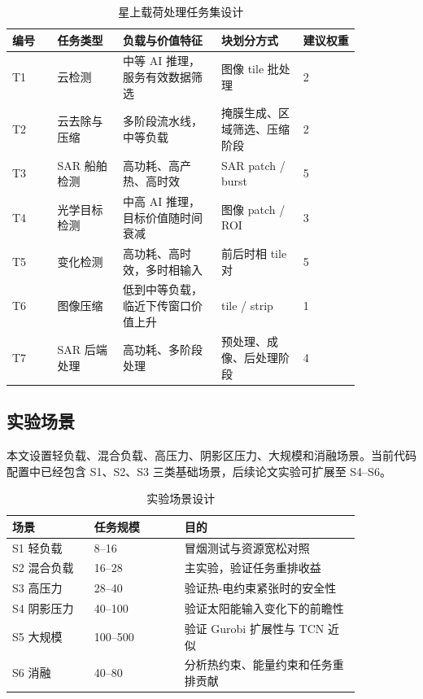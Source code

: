 \documentclass[conference]{IEEEtran}
\begin{document}
\begin{table}[t]
\centering
\caption{星上载荷处理任务集设计}
\label{tab:taskset}
\begin{tabular}{p{0.11\linewidth}p{0.16\linewidth}p{0.24\linewidth}p{0.20\linewidth}p{0.14\linewidth}}
\toprule
编号 & 任务类型 & 负载与价值特征 & 块划分方式 & 建议权重 \\
\midrule
T1 & 云检测 & 中等 AI 推理，服务有效数据筛选 & 图像 tile 批处理 & 2 \\
T2 & 云去除与压缩 & 多阶段流水线，中等负载 & 掩膜生成、区域筛选、压缩阶段 & 2 \\
T3 & SAR 船舶检测 & 高功耗、高产热、高时效 & SAR patch / burst & 5 \\
T4 & 光学目标检测 & 中高 AI 推理，目标价值随时间衰减 & 图像 patch / ROI & 3 \\
T5 & 变化检测 & 高功耗、高时效，多时相输入 & 前后时相 tile 对 & 5 \\
T6 & 图像压缩 & 低到中等负载，临近下传窗口价值上升 & tile / strip & 1 \\
T7 & SAR 后端处理 & 高功耗、多阶段处理 & 预处理、成像、后处理阶段 & 4 \\
\bottomrule
\end{tabular}
\end{table}

\subsection{实验场景}

本文设置轻负载、混合负载、高压力、阴影区压力、大规模和消融场景。当前代码配置中已经包含 S1、S2、S3 三类基础场景，后续论文实验可扩展至 S4--S6。

\begin{table}[t]
\centering
\caption{实验场景设计}
\label{tab:scenarios}
\begin{tabular}{p{0.20\linewidth}p{0.22\linewidth}p{0.43\linewidth}}
\toprule
场景 & 任务规模 & 目的 \\
\midrule
S1 轻负载 & 8--16 & 冒烟测试与资源宽松对照 \\
S2 混合负载 & 16--28 & 主实验，验证任务重排收益 \\
S3 高压力 & 28--40 & 验证热-电约束紧张时的安全性 \\
S4 阴影压力 & 40--100 & 验证太阳能输入变化下的前瞻性 \\
S5 大规模 & 100--500 & 验证 Gurobi 扩展性与 TCN 近似 \\
S6 消融 & 40--80 & 分析热约束、能量约束和任务重排贡献 \\
\bottomrule
\end{tabular}
\end{table}
\end{document}
